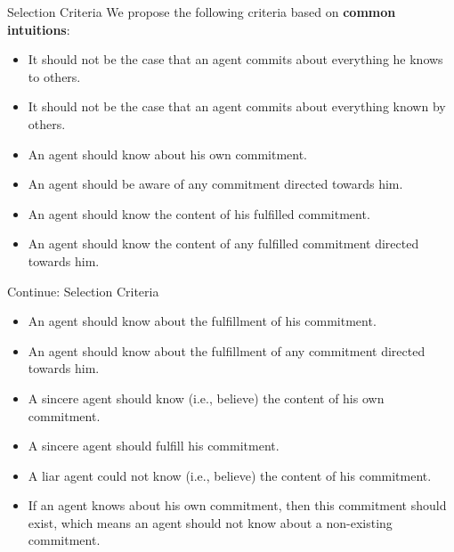 \documentclass{beamer}
\begin{document}
\begin{frame}{Selection Criteria}
We propose the following criteria based on \textbf{common intuitions}:
\begin{itemize}
  \item It should not be the case that an agent commits about everything he knows to others.
  \item It should not be the case that an agent commits about everything known by others.
  \item An agent should know about his own commitment.
  \item An agent should be aware of any commitment directed towards him.
  \item An agent should know the content of his fulfilled commitment.
  \item An agent should know the content of any fulfilled commitment directed towards him.


\end{itemize}

\end{frame}
\begin{frame}{Continue: Selection Criteria}
\begin{itemize}
 \item An agent should know about the fulfillment of his commitment.
 \item An agent should know about the fulfillment of any commitment directed towards him.
  \item A sincere agent should know (i.e., believe) the content of his own commitment.
  \item A sincere agent should fulfill his commitment.
  \item A liar agent could not know (i.e., believe) the content of his commitment.
  \item If an agent knows about his own commitment, then this commitment should exist, which means an agent should not know about a non-existing commitment.
\end{itemize}
\end{frame}

\end{document}
